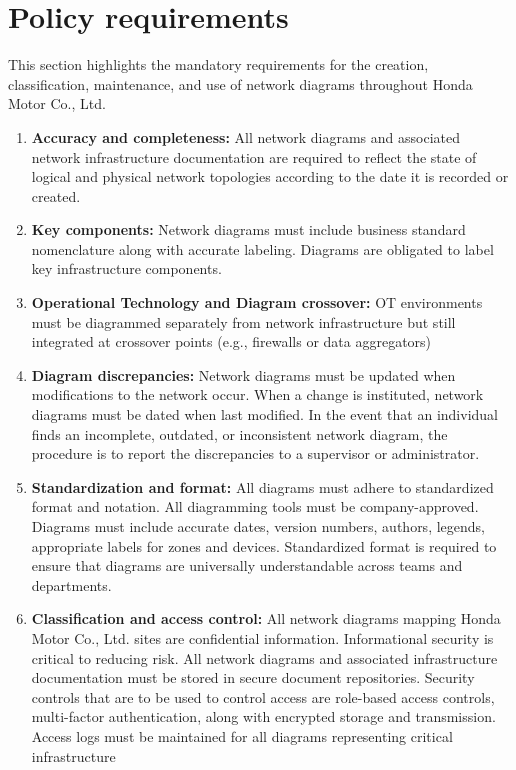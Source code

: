 \section{Policy requirements}
This section highlights the mandatory requirements for the creation, classification, maintenance, and use of network diagrams throughout Honda Motor Co., Ltd.
\begin{enumerate}
    \item \textbf{Accuracy and completeness:} All network diagrams and associated network infrastructure documentation are required to reflect the state of logical and physical network topologies according to the date it is recorded or created.
    \item \textbf{Key components:} Network diagrams must include business standard nomenclature along with accurate labeling. Diagrams are obligated to label key infrastructure components.
    \item \textbf{Operational Technology and Diagram crossover:} OT environments must be diagrammed separately from network infrastructure but still integrated at crossover points (e.g., firewalls or data aggregators)
    \item \textbf{Diagram discrepancies:} Network diagrams must be updated when modifications to the network occur. When a change is instituted, network diagrams must be dated when last modified. In the event that an individual finds an incomplete, outdated, or inconsistent network diagram, the procedure is to report the discrepancies to a supervisor or administrator.
    \item \textbf{Standardization and format:} All diagrams must adhere to standardized format and notation. All diagramming tools must be company-approved. Diagrams must include accurate dates, version numbers, authors, legends, appropriate labels for zones and devices. Standardized format is required to ensure that diagrams are universally understandable across teams and departments.
    \item \textbf{Classification and access control:} All network diagrams mapping Honda Motor Co., Ltd. sites are confidential information. Informational security is critical to reducing risk. All network diagrams and associated infrastructure documentation must be stored in secure document repositories. Security controls that are to be used to control access are role-based access controls, multi-factor authentication, along with encrypted storage and transmission. Access logs must be maintained for all diagrams representing critical infrastructure

\end{enumerate}
